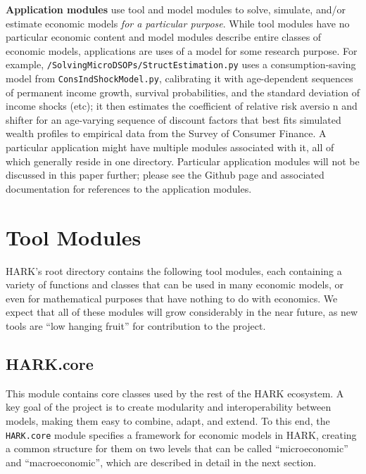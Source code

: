 \message{ !name(ccarroll_et_al_scipy_2018.tex)}\documentclass[10pt,twocolumn]{article}
\begin{document}
\textbf{Application modules} use tool and model modules to solve, simulate, and/or estimate economic models \emph{for a particular purpose}. While tool modules have no particular economic content and model modules describe entire classes of economic models, applications are uses of a model for some research purpose. For example, \texttt{/SolvingMicroDSOPs/StructEstimation.py} uses a consumption-saving model from \texttt{ConsIndShockModel.py}, calibrating it with age-dependent sequences of permanent income growth, survival probabilities, and the standard deviation of income shocks (etc); it then estimates the coefficient of relative risk aversio n and shifter for an age-varying sequence of discount factors that best fits simulated wealth profiles to empirical data from the Survey of Consumer Finance. A particular application might have multiple modules associated with it, all of which generally reside in one directory. Particular application modules will not be discussed in this paper further; please see the Github page and associated documentation for references to the application modules.

\section{\texorpdfstring{Tool Modules
\label{sec:tool-modules}}{Tool Modules }}\label{tool-modules}

HARK's root directory contains the following tool modules, each containing a variety of functions and classes that can be used in many economic models, or even for mathematical purposes that have nothing to do with economics. We expect that all of these modules will grow considerably in the near future, as new tools are ``low hanging fruit'' for contribution to the project.

\subsection{HARK.core}\label{harkcore}

This module contains core classes used by the rest of the HARK ecosystem. A key goal of the project is to create modularity and interoperability between models, making them easy to combine, adapt, and extend. To this end, the \texttt{HARK.core} module specifies a framework for economic models in HARK, creating a common structure for them on two levels that can be called ``microeconomic'' and ``macroeconomic'', which are described in detail in the next section.
\end{document}
